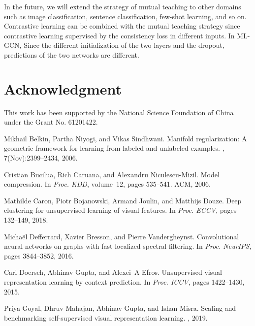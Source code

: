 \documentclass{article}
\begin{document}
In the future, we will extend the strategy of mutual teaching to other domains such as image classification, sentence classification, few-shot learning, and so on. Contrastive learning can be combined with the mutual teaching strategy since contrastive learning supervised by the consistency loss in different inputs. In ML-GCN, Since the different initialization of the two layers and the dropout, predictions of the two networks are different.
\section{Acknowledgment}
This work has been supported by the National Science Foundation of China under the Grant No. 61201422.

\begin{thebibliography}{}

Mikhail Belkin, Partha Niyogi, and Vikas Sindhwani.
\newblock Manifold regularization: A geometric framework for learning from
  labeled and unlabeled examples.
, 7(Nov):2399--2434, 2006.

Cristian Bucilua, Rich Caruana, and Alexandru Niculescu-Mizil.
\newblock Model compression.
\newblock In {\em Proc. KDD}, volume~12, pages 535--541. ACM, 2006.

Mathilde Caron, Piotr Bojanowski, Armand Joulin, and Matthijs Douze.
\newblock Deep clustering for unsupervised learning of visual features.
\newblock In {\em Proc. ECCV}, pages 132--149, 2018.

Micha{\"e}l Defferrard, Xavier Bresson, and Pierre Vandergheynst.
\newblock Convolutional neural networks on graphs with fast localized spectral
  filtering.
\newblock In {\em Proc. NeurIPS}, pages 3844--3852, 2016.

Carl Doersch, Abhinav Gupta, and Alexei~A Efros.
\newblock Unsupervised visual representation learning by context prediction.
\newblock In {\em Proc. ICCV}, pages 1422--1430, 2015.

Priya Goyal, Dhruv Mahajan, Abhinav Gupta, and Ishan Misra.
\newblock Scaling and benchmarking self-supervised visual representation
  learning.
, 2019.


\end{thebibliography}
\end{document}
